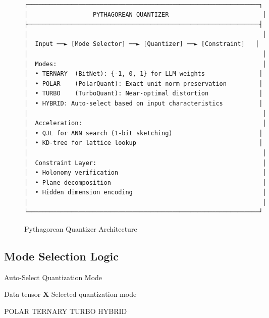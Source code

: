 \documentclass{article}
\begin{document}
\begin{figure}[h]
\centering
\begin{verbatim}
┌────────────────────────────────────────────────────────────────┐
│                  PYTHAGOREAN QUANTIZER                          │
├────────────────────────────────────────────────────────────────┤
│                                                                 │
│  Input ──► [Mode Selector] ──► [Quantizer] ──► [Constraint]   │
│                                                                 │
│  Modes:                                                         │
│  • TERNARY  (BitNet): {-1, 0, 1} for LLM weights               │
│  • POLAR    (PolarQuant): Exact unit norm preservation         │
│  • TURBO    (TurboQuant): Near-optimal distortion              │
│  • HYBRID: Auto-select based on input characteristics          │
│                                                                 │
│  Acceleration:                                                  │
│  • QJL for ANN search (1-bit sketching)                        │
│  • KD-tree for lattice lookup                                  │
│                                                                 │
│  Constraint Layer:                                              │
│  • Holonomy verification                                        │
│  • Plane decomposition                                          │
│  • Hidden dimension encoding                                    │
│                                                                 │
└────────────────────────────────────────────────────────────────┘
\end{verbatim}
\caption{Pythagorean Quantizer Architecture}
\end{figure}

\subsection{Mode Selection Logic}

\begin{algorithm}
\caption{Auto-Select Quantization Mode}
\begin{algorithmic}[1]
\REQUIRE Data tensor $\mathbf{X}$
\ENSURE Selected quantization mode

    \RETURN POLAR
    \RETURN TERNARY
    \RETURN TURBO
\ELSE
    \RETURN HYBRID
\ENDIF
\end{algorithmic}
\end{algorithm}
\end{document}
